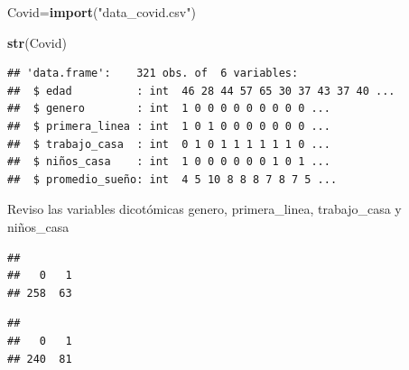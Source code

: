 \documentclass[
]{article}
\newenvironment{Shaded}{\begin{snugshade}}{\end{snugshade}}
\newcommand{\FunctionTok}[1]{\textcolor[rgb]{0.13,0.29,0.53}{\textbf{#1}}}
\newcommand{\NormalTok}[1]{#1}
\newcommand{\OtherTok}[1]{\textcolor[rgb]{0.56,0.35,0.01}{#1}}
\newcommand{\SpecialCharTok}[1]{\textcolor[rgb]{0.81,0.36,0.00}{\textbf{#1}}}
\newcommand{\StringTok}[1]{\textcolor[rgb]{0.31,0.60,0.02}{#1}}
\begin{document}
\begin{Shaded}
\begin{Highlighting}[]
\NormalTok{Covid}\OtherTok{=}\FunctionTok{import}\NormalTok{(}\StringTok{"data\_covid.csv"}\NormalTok{)}
\end{Highlighting}
\end{Shaded}

\begin{Shaded}
\begin{Highlighting}[]
\FunctionTok{str}\NormalTok{(Covid)}
\end{Highlighting}
\end{Shaded}

\begin{verbatim}
## 'data.frame':    321 obs. of  6 variables:
##  $ edad          : int  46 28 44 57 65 30 37 43 37 40 ...
##  $ genero        : int  1 0 0 0 0 0 0 0 0 0 ...
##  $ primera_linea : int  1 0 1 0 0 0 0 0 0 0 ...
##  $ trabajo_casa  : int  0 1 0 1 1 1 1 1 1 0 ...
##  $ niños_casa    : int  1 0 0 0 0 0 0 1 0 1 ...
##  $ promedio_sueño: int  4 5 10 8 8 8 7 8 7 5 ...
\end{verbatim}

Reviso las variables dicotómicas genero, primera\_linea, trabajo\_casa y
niños\_casa

\begin{Shaded}
\end{Shaded}

\begin{verbatim}
## 
##   0   1 
## 258  63
\end{verbatim}

\begin{Shaded}
\end{Shaded}

\begin{verbatim}
## 
##   0   1 
## 240  81
\end{verbatim}

\begin{Shaded}
\end{Shaded}
\end{document}
